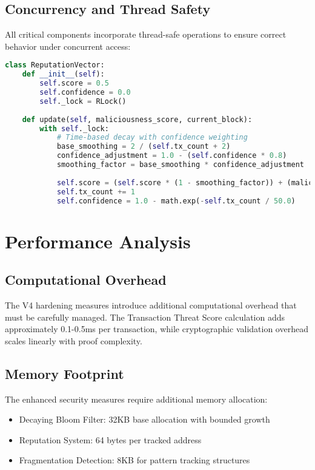 \documentclass{article}
\begin{document}
\subsection{Concurrency and Thread Safety}

All critical components incorporate thread-safe operations to ensure correct behavior under concurrent access:

\begin{lstlisting}[language=Python,caption={Thread-Safe Reputation Updates},label={lst:threadsafe}]
class ReputationVector:
    def __init__(self):
        self.score = 0.5
        self.confidence = 0.0
        self._lock = RLock()
    
    def update(self, maliciousness_score, current_block):
        with self._lock:
            # Time-based decay with confidence weighting
            base_smoothing = 2 / (self.tx_count + 2)
            confidence_adjustment = 1.0 - (self.confidence * 0.8)
            smoothing_factor = base_smoothing * confidence_adjustment
            
            self.score = (self.score * (1 - smoothing_factor)) + (maliciousness_score * smoothing_factor)
            self.tx_count += 1
            self.confidence = 1.0 - math.exp(-self.tx_count / 50.0)
\end{lstlisting}

\section{Performance Analysis}

\subsection{Computational Overhead}

The V4 hardening measures introduce additional computational overhead that must be carefully managed. The Transaction Threat Score calculation adds approximately 0.1-0.5ms per transaction, while cryptographic validation overhead scales linearly with proof complexity.

\subsection{Memory Footprint}

The enhanced security measures require additional memory allocation:
\begin{itemize}
\item Decaying Bloom Filter: 32KB base allocation with bounded growth
\item Reputation System: 64 bytes per tracked address
\item Fragmentation Detection: 8KB for pattern tracking structures
\end{itemize}
\end{document}
